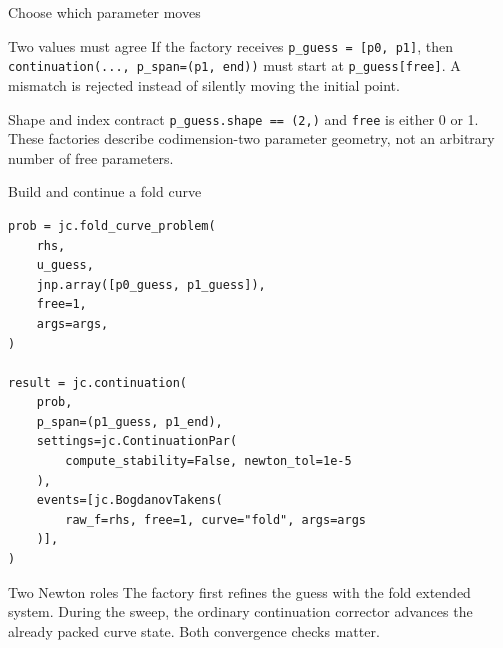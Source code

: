 \begin{frame}{Choose which parameter moves}
\centering
{}
\vspace{5mm}
\begin{block}{Two values must agree}
If the factory receives \texttt{p\_guess = [p0, p1]}, then
\texttt{continuation(..., p\_span=(p1, end))} must start at
\texttt{p\_guess[free]}. A mismatch is rejected instead of silently moving
the initial point.
\end{block}
\begin{alertblock}{Shape and index contract}
\texttt{p\_guess.shape == (2,)} and \texttt{free} is either 0 or 1. These
factories describe codimension-two parameter geometry, not an arbitrary
number of free parameters.
\end{alertblock}
\end{frame}

\begin{frame}[fragile]{Build and continue a fold curve}
\small
\begin{lstlisting}
prob = jc.fold_curve_problem(
    rhs,
    u_guess,
    jnp.array([p0_guess, p1_guess]),
    free=1,
    args=args,
)

result = jc.continuation(
    prob,
    p_span=(p1_guess, p1_end),
    settings=jc.ContinuationPar(
        compute_stability=False, newton_tol=1e-5
    ),
    events=[jc.BogdanovTakens(
        raw_f=rhs, free=1, curve="fold", args=args
    )],
)
\end{lstlisting}
\begin{block}{Two Newton roles}
The factory first refines the guess with the fold extended system. During the
sweep, the ordinary continuation corrector advances the already packed curve
state. Both convergence checks matter.
\end{block}
\end{frame}

